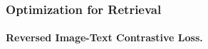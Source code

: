 \documentclass[letterpaper]{article} %
\begin{document}

\subsubsection{Optimization for Retrieval}

\paragraph{Reversed Image-Text Contrastive Loss.}
\end{document}
